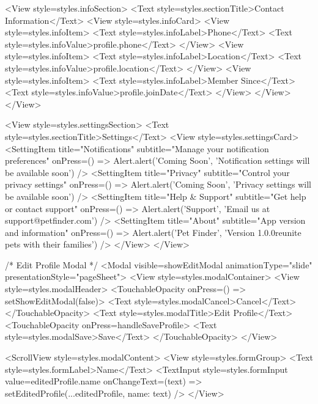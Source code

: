 {      <View style={styles.infoSection}>
        <Text style={styles.sectionTitle}>Contact Information</Text>
        <View style={styles.infoCard}>
          <View style={styles.infoItem}>
            <Text style={styles.infoLabel}>Phone</Text>
            <Text style={styles.infoValue}>{profile.phone}</Text>
          </View>
          <View style={styles.infoItem}>
            <Text style={styles.infoLabel}>Location</Text>
            <Text style={styles.infoValue}>{profile.location}</Text>
          </View>
          <View style={styles.infoItem}>
            <Text style={styles.infoLabel}>Member Since</Text>
            <Text style={styles.infoValue}>{profile.joinDate}</Text>
          </View>
        </View>
      </View>

      <View style={styles.settingsSection}>
        <Text style={styles.sectionTitle}>Settings</Text>
        <View style={styles.settingsCard}>
          <SettingItem 
            title="Notifications" 
            subtitle="Manage your notification preferences"
            onPress={() => Alert.alert('Coming Soon', 'Notification settings will be available soon')}
          />
          <SettingItem 
            title="Privacy" 
            subtitle="Control your privacy settings"
            onPress={() => Alert.alert('Coming Soon', 'Privacy settings will be available soon')}
          />
          <SettingItem 
            title="Help & Support" 
            subtitle="Get help or contact support"
            onPress={() => Alert.alert('Support', 'Email us at support@petfinder.com')}
          />
          <SettingItem 
            title="About" 
            subtitle="App version and information"
            onPress={() => Alert.alert('Pet Finder', 'Version 1.0.0\nHelping reunite pets with their families')}
          />
        </View>
      </View>

      {/* Edit Profile Modal */}
      <Modal visible={showEditModal} animationType="slide" presentationStyle="pageSheet">
        <View style={styles.modalContainer}>
          <View style={styles.modalHeader}>
            <TouchableOpacity onPress={() => setShowEditModal(false)}>
              <Text style={styles.modalCancel}>Cancel</Text>
            </TouchableOpacity>
            <Text style={styles.modalTitle}>Edit Profile</Text>
            <TouchableOpacity onPress={handleSaveProfile}>
              <Text style={styles.modalSave}>Save</Text>
            </TouchableOpacity>
          </View>
          
          <ScrollView style={styles.modalContent}>
            <View style={styles.formGroup}>
              <Text style={styles.formLabel}>Name</Text>
              <TextInput
                style={styles.formInput}
                value={editedProfile.name}
                onChangeText={(text) => setEditedProfile({...editedProfile, name: text})}
              />
            </View>
            
}
